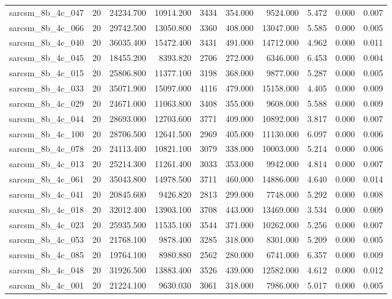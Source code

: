 \begin{tabular}{lrrrrrrrrr}
sarcsm\_8b\_4c\_047 & 20 & 24234.700 & 10914.200 & 3434 & 354.000 & 9524.000 & 5.472 & 0.000 & 0.007 \\
sarcsm\_8b\_4c\_066 & 20 & 29742.500 & 13050.800 & 3360 & 408.000 & 13047.000 & 5.585 & 0.000 & 0.005 \\
sarcsm\_8b\_4c\_040 & 20 & 36035.400 & 15472.400 & 3431 & 491.000 & 14712.000 & 4.962 & 0.000 & 0.011 \\
sarcsm\_8b\_4c\_045 & 20 & 18455.200 & 8393.820 & 2706 & 272.000 & 6346.000 & 6.453 & 0.000 & 0.004 \\
sarcsm\_8b\_4c\_015 & 20 & 25806.800 & 11377.100 & 3198 & 368.000 & 9877.000 & 5.287 & 0.000 & 0.005 \\
sarcsm\_8b\_4c\_033 & 20 & 35071.900 & 15097.000 & 4116 & 479.000 & 15158.000 & 4.405 & 0.000 & 0.009 \\
sarcsm\_8b\_4c\_029 & 20 & 24671.000 & 11063.800 & 3408 & 355.000 & 9608.000 & 5.588 & 0.000 & 0.009 \\
sarcsm\_8b\_4c\_044 & 20 & 28693.000 & 12703.600 & 3771 & 409.000 & 10892.000 & 3.817 & 0.000 & 0.007 \\
sarcsm\_8b\_4c\_100 & 20 & 28706.500 & 12641.500 & 2969 & 405.000 & 11130.000 & 6.097 & 0.000 & 0.006 \\
sarcsm\_8b\_4c\_078 & 20 & 24113.400 & 10821.100 & 3079 & 338.000 & 10003.000 & 5.214 & 0.000 & 0.006 \\
sarcsm\_8b\_4c\_013 & 20 & 25214.300 & 11261.400 & 3033 & 353.000 & 9942.000 & 4.814 & 0.000 & 0.007 \\
sarcsm\_8b\_4c\_061 & 20 & 35043.800 & 14978.500 & 3711 & 460.000 & 14886.000 & 4.640 & 0.000 & 0.014 \\
sarcsm\_8b\_4c\_041 & 20 & 20845.600 & 9426.820 & 2813 & 299.000 & 7748.000 & 5.292 & 0.000 & 0.008 \\
sarcsm\_8b\_4c\_018 & 20 & 32012.400 & 13903.100 & 3708 & 443.000 & 13469.000 & 3.534 & 0.000 & 0.009 \\
sarcsm\_8b\_4c\_023 & 20 & 25935.500 & 11535.100 & 3544 & 371.000 & 10262.000 & 5.256 & 0.000 & 0.007 \\
sarcsm\_8b\_4c\_053 & 20 & 21768.100 & 9878.400 & 3285 & 318.000 & 8301.000 & 5.209 & 0.000 & 0.005 \\
sarcsm\_8b\_4c\_085 & 20 & 19764.100 & 8980.880 & 2562 & 280.000 & 6741.000 & 6.357 & 0.000 & 0.009 \\
sarcsm\_8b\_4c\_048 & 20 & 31926.500 & 13883.400 & 3526 & 439.000 & 12582.000 & 4.612 & 0.000 & 0.012 \\
sarcsm\_8b\_4c\_001 & 20 & 21224.100 & 9630.030 & 3061 & 318.000 & 7986.000 & 5.017 & 0.000 & 0.005 \\

\end{tabular}
